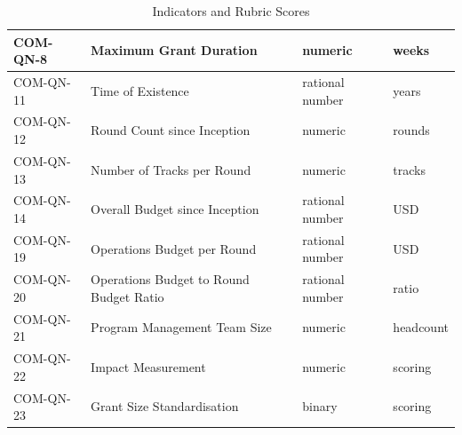 \documentclass[a4,10pt]{article}
\begin{document}
\begin{table}[ht!]
\begin{tabular}{l|l|l|l}
COM-QN-8 & Maximum Grant Duration & numeric & weeks \\ \hline
COM-QN-11 & Time of Existence & rational number & years \\ \hline
COM-QN-12 & Round Count since Inception & numeric & rounds \\ \hline
COM-QN-13 & Number of Tracks per Round & numeric & tracks \\ \hline
COM-QN-14 & Overall Budget since Inception & rational number & USD \\ \hline
COM-QN-19 & Operations Budget per Round & rational number & USD \\ \hline
COM-QN-20 & Operations Budget to Round Budget Ratio & rational number & ratio \\ \hline
COM-QN-21 & Program Management Team Size & numeric & headcount \\ \hline
COM-QN-22 & Impact Measurement & numeric & scoring \\ \hline
COM-QN-23 & Grant Size Standardisation & binary & scoring \\ 
\end{tabular}
\caption{Indicators and Rubric Scores}
\label{Table:3}
\end{table}
\newpage
\end{document}
